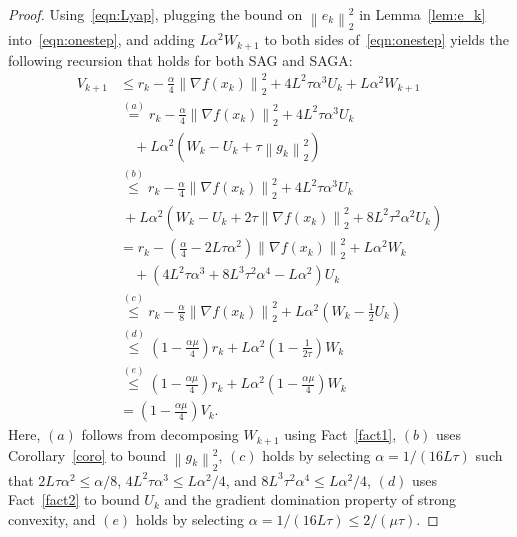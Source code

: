 \documentclass{article}
\theoremstyle{plain}
\theoremstyle{definition}
\newcommand{\norm}[1]{\left\| #1\right\|_{2}}
\newcommand{\paren}[1]{\left( #1\right)}
\begin{document}
\begin{proof}
Using~\eqref{eqn:Lyap}, plugging the bound on $\norm{e_k}^2$ in Lemma~\ref{lem:e_k} into~\eqref{eqn:onestep}, and adding $L\alpha^2W_{k+1}$ to both sides of~\eqref{eqn:onestep} yields the following recursion that holds for both SAG and SAGA:
\begin{equation}
\begin{aligned}
    V_{k+1}&\leq r_k - \frac{\alpha}{4}\norm{\nabla f(x_k)}^2+ 4L^2\tau\alpha^3U_k + L\alpha^2 W_{k+1}\\
    &\overset{(a)}{=}r_k - \frac{\alpha}{4}\norm{\nabla f(x_k)}^2+ 4L^2\tau\alpha^3U_k\\
    &\quad + L\alpha^2 \paren{W_k - U_k +\tau\norm{g_k}^2}\\
    &\overset{(b)}{\leq} r_k - \frac{\alpha}{4}\norm{\nabla f(x_k)}^2+ 4L^2\tau\alpha^3U_k\\
    &\ + L\alpha^2 \paren{W_k - U_k +2\tau\norm{\nabla f(x_k)}^2+8L^2\tau^2\alpha^2U_k}\\
    &=r_k-\paren{\frac{\alpha}{4}-2L\tau\alpha^2}\norm{\nabla f(x_k)}^2 + L\alpha^2 W_k\\
    &\quad + \paren{4L^2\tau\alpha^3+8L^3\tau^2\alpha^4 - L\alpha^2}U_k\\
    &\overset{(c)}{\leq} r_k - \frac{\alpha}{8}\norm{\nabla f(x_k)}^2 + L\alpha^2 \paren{W_k - \frac{1}{2}U_k}\\
    &\overset{(d)}{\leq} \paren{1-\frac{\alpha\mu}{4}}r_k + L\alpha^2\paren{1-\frac{1}{2\tau}} W_k\\
    &\overset{(e)}{\leq} \paren{1-\frac{\alpha\mu}{4}}r_k + L\alpha^2\paren{1-\frac{\alpha\mu}{4}} W_k\\
    &=\paren{1-\frac{\alpha\mu}{4}}V_k.\label{eqn:onestep_lyapunov}
\end{aligned}
\end{equation}
Here, $(a)$ follows from decomposing $W_{k+1}$ using Fact~\ref{fact1}, $(b)$ uses Corollary~\ref{coro} to bound $\norm{g_k}^2$, $(c)$ holds by selecting $\alpha= 1/(16L\tau)$ such that $2L\tau\alpha^2\leq \alpha/8$, $4L^2\tau\alpha^3\leq L\alpha^2/4$, and $8L^3\tau^2\alpha^4\leq L\alpha^2/4$, $(d)$ uses Fact~\ref{fact2} to bound $U_k$ and the gradient domination property of strong convexity, and $(e)$ holds by selecting $\alpha= 1/(16L\tau)\leq 2/(\mu\tau)$.
\end{proof}
\end{document}
